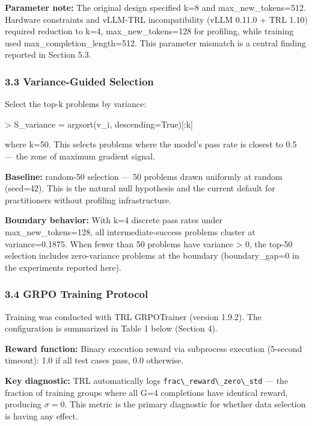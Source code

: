 \textbf{Parameter note:} The original design specified k=8 and max\_new\_tokens=512. Hardware constraints and vLLM-TRL incompatibility (vLLM 0.11.0 + TRL 1.10) required reduction to k=4, max\_new\_tokens=128 for profiling, while training used max\_completion\_length=512. This parameter mismatch is a central finding reported in Section 5.3.

\subsubsection{3.3 Variance-Guided Selection}

Select the top-k problems by variance:

> S\_variance = argsort(v\_i, descending=True)[:k]

where k=50. This selects problems where the model's pass rate is closest to 0.5 --- the zone of maximum gradient signal.

\textbf{Baseline:} random-50 selection --- 50 problems drawn uniformly at random (seed=42). This is the natural null hypothesis and the current default for practitioners without profiling infrastructure.

\textbf{Boundary behavior:} With k=4 discrete pass rates under max\_new\_tokens=128, all intermediate-success problems cluster at variance=0.1875. When fewer than 50 problems have variance > 0, the top-50 selection includes zero-variance problems at the boundary (boundary\_gap=0 in the experiments reported here).

\subsubsection{3.4 GRPO Training Protocol}

Training was conducted with TRL GRPOTrainer (version 1.9.2). The configuration is summarized in Table 1 below (Section 4).

\textbf{Reward function:} Binary execution reward via subprocess execution (5-second timeout): 1.0 if all test cases pass, 0.0 otherwise.

\textbf{Key diagnostic:} TRL automatically logs \texttt{frac\textbackslash \_reward\textbackslash \_zero\textbackslash \_std} --- the fraction of training groups where all G=4 completions have identical reward, producing $\sigma =0$. This metric is the primary diagnostic for whether data selection is having any effect.

